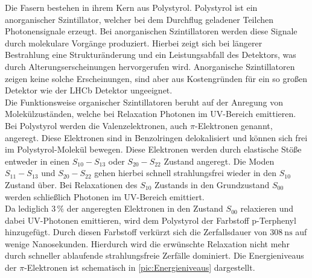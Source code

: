 Die Fasern bestehen in ihrem Kern aus Polystyrol. Polystyrol ist ein anorganischer Szintillator, welcher bei dem 
Durchflug geladener Teilchen Photonensignale erzeugt. Bei anorganischen Szintillatoren werden diese Signale durch
molekulare Vorgänge produziert. Hierbei zeigt sich bei längerer Bestrahlung eine Strukturänderung und ein Leistungsabfall des
Detektors, was durch Alterungserscheinungen hervorgerufen wird. Anorganische Szintillatoren zeigen keine solche Erscheinungen,
sind aber aus Kostengründen für ein so großen Detektor wie der LHCb Detektor ungeeignet.\\
Die Funktionsweise organischer Szintillatoren beruht auf der Anregung von Molekülzuständen, welche bei Relaxation
Photonen im UV-Bereich emittieren. Bei Polystyrol werden die Valenzelektronen, auch $\pi$-Elektronen genannt, angeregt.
Diese Elektronen sind in Benzolringen delokalisiert und können sich frei im Polystyrol-Molekül bewegen. Diese Elektronen
werden durch elastische Stöße entweder in einen $S_{10} - S_{13}$ oder $S_{20} - S_{22}$ Zustand angeregt. Die Moden $S_{11} - S_{13}$ und $S_{20} - S_{22}$
gehen hierbei schnell strahlungsfrei wieder in den $S_{10}$ Zustand über. Bei Relaxationen des $S_{10}$ Zustands in den 
Grundzustand $S_{00}$ werden schließlich Photonen im UV-Bereich emittiert.\\
Da lediglich $3 \, \%$ der angeregten Elektronen in den Zustand $S_{00}$ relaxieren und dabei UV-Photonen
emittieren, wird dem Polystyrol der Farbstoff p-Terphenyl hinzugefügt. Durch diesen Farbstoff verkürzt sich die Zerfallsdauer
von $\qty{308}{\nano\second}$ auf wenige Nanosekunden. Hierdurch wird die erwünschte Relaxation nicht mehr durch 
schneller ablaufende strahlungsfreie Zerfälle dominiert. Die Energieniveaus der $\pi$-Elektronen ist schematisch in 
\autoref{pic:Energieniveaus} dargestellt.

